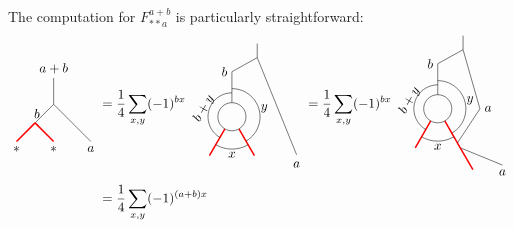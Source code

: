 The computation for $F_{**a}^{a+b}$ is particularly straightforward:
	\begin{align}
		\begin{tikzpicture}[scale=0.7,baseline=(current bounding box.center)]
			\draw[] (0,0) -- (0,1) node[pos=1,above]{$a+b$};
			\draw[] (0,0) -- (-0.707107,-0.707107) node [pos=.5,left] {$b$};
			\draw[red,line width=0.4mm] (-0.707107,-0.707107) -- (-1.41421,-1.41421);
			\draw[red,line width=0.4mm] (-0.707107,-0.707107) -- (0,-1.41421);
			\draw (0,0) -- (0.707107,-0.707107);
			\draw (0.707107,-0.707107) -- (1.41421,-1.41421);
			\node at (-1.41421,-1.7) {$*$};
			\node at (0,-1.7) {$*$};
			\node at (1.41421,-1.7) {$a$};
		\end{tikzpicture}&=
		\frac{1}{4}\sum_{x,y}(-1)^{bx}
		\begin{tikzpicture}[scale=.75,baseline=(current bounding box.center)]
			\draw (0,0) circle (0.5cm);
			\draw[red,line width=0.4mm]
			\foreach \a in {-60, -120} {
				(\a:0.5) -- (\a:1.6)
			};
			\draw[] (90:0.5) -- (90:1.6);
			\draw ([shift=(-60:1cm)]0,0) arc (-60:90:1cm);
			\draw ([shift=(-120:1.15cm)]0,0) arc (-120:-60:1.15cm);
			\draw ([shift=(240:0.85cm)]0,0) arc (240:90:0.85cm);
			\draw[] (0,1.6) -- (0.9,2.1) node[pos=0,left] {$b$};
			\draw[] (0.9,2.1) -- (0.9,2.6);
			\draw (0.9,2.1) -- (2.3,-1.35);
			\node[rotate=60] at (-1,0.3) {$b+y$};
			\node at (1.15,0.3) {$y$};
			\node at (2.3,-1.7) {$a$};
			\node at (0,-1.35) {$x$};
		\end{tikzpicture}
		=\frac{1}{4}\sum_{x,y}(-1)^{bx}
		\begin{tikzpicture}[scale=.75,baseline=(current bounding box.center)]
		\draw (0,0) circle (0.5cm);
		\draw[red,line width=0.4mm]
		\foreach \a in {-60, -120} {
			(\a:0.5) -- (\a:1.6)
		};
		\draw[] (90:0.5) -- (90:1.6);
		\draw ([shift=(-60:1cm)]0,0) arc (-60:90:1cm);
		\draw ([shift=(-120:1.15cm)]0,0) arc (-120:-60:1.15cm);
		\draw ([shift=(240:0.85cm)]0,0) arc (240:90:0.85cm);
		\draw[] (0,1.6) -- (0.9,2.1) node[pos=0,left] {$b$};
		\draw[] (0.9,2.1) -- (0.9,2.6);
		\draw (-60:1.6) -- (2.3,-2) node[pos=1,below] {$a$};
		\draw (-60:1.4) --(1.5,0) node[right]{$a$} -- (0.9,2.1);
		\node[rotate=60] at (-1,0.3) {$b+y$};
		\node at (1.15,0.3) {$y$};
		\node at (0,-1.35) {$x$};
		\draw[red,line width=0.4mm] (-60:1.6)--(-60:2.5);
		\end{tikzpicture}
		\\
		&=\frac{1}{4}\sum_{x,y}(-1)^{(a+b)x}
		\begin{tikzpicture}[scale=.75,baseline=(current bounding box.center)]

\end{tikzpicture}
\end{align}
